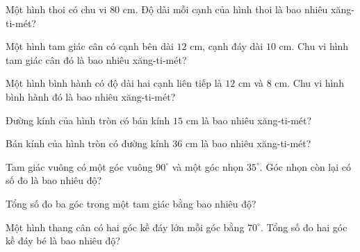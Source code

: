 \begin{ex}
  Một hình thoi có chu vi $80\text{ cm}$. Độ dài mỗi cạnh của hình thoi là bao nhiêu xăng-ti-mét?
\end{ex}

\begin{ex}
  Một hình tam giác cân có cạnh bên dài $12\text{ cm}$, cạnh đáy dài $10\text{ cm}$. Chu vi hình tam giác cân đó là bao nhiêu xăng-ti-mét?
\end{ex}

\begin{ex}
  Một hình bình hành có độ dài hai cạnh liên tiếp là $12\text{ cm}$ và $8\text{ cm}$. Chu vi hình bình hành đó là bao nhiêu xăng-ti-mét?
\end{ex}

\begin{ex}
  Đường kính của hình tròn có bán kính $15\text{ cm}$ là bao nhiêu xăng-ti-mét?
\end{ex}

\begin{ex}
  Bán kính của hình tròn có đường kính $36\text{ cm}$ là bao nhiêu xăng-ti-mét?
\end{ex}

\begin{ex}
  Tam giác vuông có một góc vuông $90^\circ$ và một góc nhọn $35^\circ$. Góc nhọn còn lại có số đo là bao nhiêu độ?
\end{ex}

\begin{ex}
  Tổng số đo ba góc trong một tam giác bằng bao nhiêu độ?
\end{ex}

\begin{ex}
  Một hình thang cân có hai góc kề đáy lớn mỗi góc bằng $70^\circ$. Tổng số đo hai góc kề đáy bé là bao nhiêu độ?
\end{ex}

